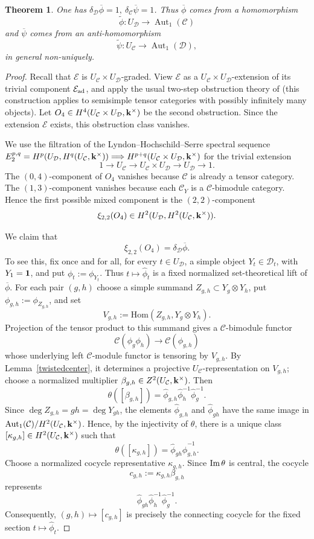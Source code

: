 \documentclass[12pt]{amsart}
\numberwithin{equation}{section}
\newtheorem{theorem}{Theorem}[section]
\theoremstyle{definition}
\newcommand{\Hom}{\text{Hom}}
\newcommand{\Aut}{\text{Aut}}
\newcommand{\1}{_{(1)}}
\newcommand{\2}{_{(2)}}
\newcommand{\3}{_{(3)}}
\newcommand{\4}{_{(4)}}
\newcommand{\5}{_{(5)}}
\newcommand{\6}{_{(6)}}
\newcommand{\C}{\mathcal{C}}
\theoremstyle{plain}
\theoremstyle{definition}
\theoremstyle{remark}
\def\C{\mathcal{C}}
\def\D{\mathcal{D}}
\def\E{\mathcal{E}}
\def\Aut{\mathop{\mathrm{Aut}}\nolimits}
\def\Hom{\mathrm{Hom}}
\begin{document}
\begin{theorem} \label{vani} 
One has $\delta_\D\overline{\phi}=1,\ \delta_\C\overline{\psi}=1$. Thus 
$\overline{\phi}$ comes from a homomorphism
\[
\widetilde{\phi}: U_\D\to \Aut_1(\C)
\]
and $\overline{\psi}$ comes from an anti-homomorphism
\[
\widetilde{\psi}: U_\C\to \Aut_1(\D),
\]
in general non-uniquely.
\end{theorem} 

\begin{proof}
Recall that $\E$ is $U_\C\times U_\D$-graded. View $\E$ as a
$U_\C\times U_\D$-extension of its trivial component $\E_{\rm ad}$, and
apply the usual two-step obstruction theory of \cite{ENO} (this
construction applies to semisimple tensor categories with possibly infinitely many objects). Let
$O_4\in H^4(U_\C\times U_\D,\bold k^\times)$
be the second obstruction. Since the extension $\E$ exists, this
obstruction class vanishes.

We use the filtration of the Lyndon--Hochschild--Serre spectral sequence $E_2^{p,q}=H^p(U_\D,H^q(U_\C,\bold k^\times))
\Longrightarrow H^{p+q}(U_\C\times U_\D,\bold k^\times)$
for the trivial extension
\[
        1\to U_\C\to U_\C\times U_\D\to U_\D\to 1.
\]
The $(0,4)$-component of $O_4$ vanishes because $\C$ is already a tensor
category. The $(1,3)$-component vanishes because each $\C_Y$ is a
$\C$-bimodule category. Hence the first possible mixed component is the
$(2,2)$-component
\[
        \xi_{2,2}(O_4)\in H^2(U_\D,H^2(U_\C,\bold k^\times)).
\]

We claim that
\[
        \xi_{2,2}(O_4)=\delta_\D\overline{\phi}.
\]
To see this, fix once and for all, for every $t\in U_\D$, a simple object
$Y_t\in\D_t$, with $Y_1=\bold 1$, and put $\phi_t:=\phi_{Y_t}$.
Thus $t\mapsto\widehat{\phi}_t$ is a fixed normalized
set-theoretical lift of $\overline\phi$. For each pair $(g,h)$ choose a
simple summand $Z_{g,h}\subset Y_g\otimes Y_h$, put
$\phi_{g,h}:=\phi_{Z_{g,h}}$, and set
\[
        V_{g,h}:=\Hom(Z_{g,h},Y_g\otimes Y_h).
\]
Projection of the tensor product to this summand gives a
$\C$-bimodule functor
\[
        \C(\phi_g\phi_h)\longrightarrow \C(\phi_{g,h})
\]
whose underlying left $\C$-module functor is tensoring by $V_{g,h}$.
By Lemma~\ref{twistedcenter}, it determines a projective
$U_\C$-representation on $V_{g,h}$; choose a normalized multiplier
$\beta_{g,h}\in Z^2(U_\C,\bold k^\times)$. Then
\[
        \theta([\beta_{g,h}])
        =\widehat{\phi}_{g,h}\widehat{\phi}_h^{-1}
         \widehat{\phi}_g^{-1}.
\]
Since $\deg Z_{g,h}=gh=\deg Y_{gh}$, the elements
$\widehat{\phi}_{g,h}$ and $\widehat{\phi}_{gh}$ have the same image
in $\Aut_1(\C)/H^2(U_\C,\bold k^\times)$. Hence, by the injectivity of
$\theta$, there is a unique class
$[\kappa_{g,h}]\in H^2(U_\C,\bold k^\times)$ such that
\[
        \theta([\kappa_{g,h}])
        =\widehat{\phi}_{gh}\widehat{\phi}_{g,h}^{-1}.
\]
Choose a normalized cocycle representative $\kappa_{g,h}$. Since
${\rm Im}\,\theta$ is central, the cocycle
\[
        c_{g,h}:=\kappa_{g,h}\beta_{g,h}
\]
represents
\[
        \widehat{\phi}_{gh}\widehat{\phi}_h^{-1}
        \widehat{\phi}_g^{-1}.
\]
Consequently, $(g,h)\mapsto[c_{g,h}]$ is precisely the connecting
cocycle for the fixed section $t\mapsto\widehat{\phi}_t$.


\end{proof}
\end{document}
